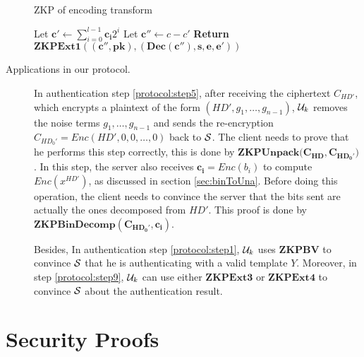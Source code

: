 \begin{description}
  \begin{algorithm}
    \caption{ZKP of encoding transform}\label{alg:ZKPBinDecomp}
    \begin{algorithmic}[1]
      \State Let $\mathbf{c'} \gets \sum_{i=0}^{l-1}\mathbf{c_i}2^i$
      \State Let $\mathbf{c''} \gets c - c' $
      \State \textbf{Return} $\mathbf{ZKPExt1((c'',pk),(Dec(c''),s,e,e'))}$
      \EndProcedure
    \end{algorithmic}
  \end{algorithm}
\item [Applications in our protocol.] In authentication step \ref{protocol:step5}, after receiving
  the ciphertext $C_{HD'}$, which encrypts a plaintext
  of the form $(HD', g_1, \dots, g_{n-1})$, $\mathcal{U}_k$ removes the noise terms $g_1, \dots,
  g_{n-1}$ and sends the re-encryption $C_{HD_0'} = Enc(HD', 0, 0, \dots,
  0)$ back to $\mathcal{S}$. The client needs to prove that he performs this step correctly, this is done
  by $\mathbf{ZKPUnpack(C_{HD},C_{HD_0'}})$. In this step, the server also receives $\mathbf{c_i} = Enc(b_i)$ to compute $Enc(x^{HD'})$, as discussed in section \ref{sec:binToUna}. Before doing this operation, the client needs to convince the server
  that the bits sent are actually the ones decomposed from $HD'$. This proof is done
  by $\mathbf{ZKPBinDecomp(C_{HD_0'},c_i)}$.

  Besides, In authentication step \ref{protocol:step1}, $\mathcal{U}_k$ uses $\mathbf{ZKPBV}$ to convince $\mathcal{S}$ that he is
  authenticating with a valid template $Y$. Moreover, in step \ref{protocol:step9}, $\mathcal{U}_k$ can use either $\mathbf{ZKPExt3}$ or $\mathbf{ZKPExt4}$ to
  convince $\mathcal{S}$ about the authentication result.
\end{description}

\section{Security Proofs}
\label{append:Proofs}
